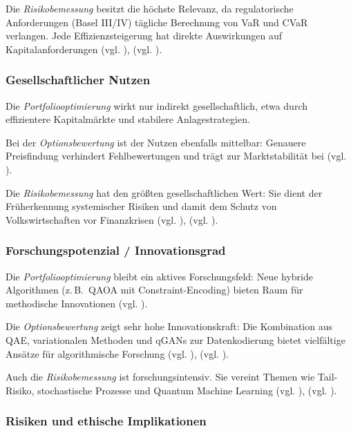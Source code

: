 {Die \textit{Risikobemessung} besitzt die höchste Relevanz, da regulatorische Anforderungen (Basel III/IV) tägliche Berechnung von VaR und CVaR verlangen. Jede Effizienzsteigerung hat direkte Auswirkungen auf Kapitalanforderungen (vgl. \cite{orus_quantum_2019}), (vgl. \cite{bouland_prospects_2020}).

\subsubsection*{Gesellschaftlicher Nutzen}

Die \textit{Portfoliooptimierung} wirkt nur indirekt gesellschaftlich, etwa durch effizientere Kapitalmärkte und stabilere Anlagestrategien.

Bei der \textit{Optionsbewertung} ist der Nutzen ebenfalls mittelbar: Genauere Preisfindung verhindert Fehlbewertungen und trägt zur Marktstabilität bei (vgl. \cite{stamatopoulos_option_2020}).

Die \textit{Risikobemessung} hat den größten gesellschaftlichen Wert: Sie dient der Früherkennung systemischer Risiken und damit dem Schutz von Volkswirtschaften vor Finanzkrisen (vgl. \cite{orus_quantum_2019}), (vgl. \cite{zoufal_quantum_2019}).

\subsubsection*{Forschungspotenzial / Innovationsgrad}

Die \textit{Portfoliooptimierung} bleibt ein aktives Forschungsfeld: Neue hybride Algorithmen (z.\,B.\ QAOA mit Constraint-Encoding) bieten Raum für methodische Innovationen (vgl. \cite{buonaiuto_best_2023}).

Die \textit{Optionsbewertung} zeigt sehr hohe Innovationskraft: Die Kombination aus QAE, variationalen Methoden und qGANs zur Datenkodierung bietet vielfältige Ansätze für algorithmische Forschung (vgl. \cite{zoufal_quantum_2019}), (vgl. \cite{stamatopoulos_option_2020}).

Auch die \textit{Risikobemessung} ist forschungsintensiv. Sie vereint Themen wie Tail-Risiko, stochastische Prozesse und Quantum Machine Learning (vgl. \cite{egger_quantum_2020}), (vgl. \cite{martin2022}).

\subsubsection*{Risiken und ethische Implikationen}

}

